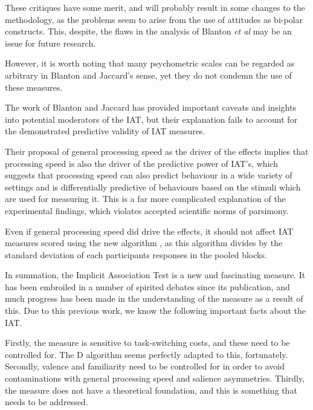 These critiques have some merit, and will probably result in some changes to the methodology, as the problems seem to arise from the use of attitudes as bi-polar constructs. This, despite, the flaws in the analysis of Blanton \textit{et al}  may be an issue for future research. %

However, it is worth noting that many psychometric scales can be regarded as arbitrary in Blanton and Jaccard's sense, yet they do not condemn the use of these measures. 

The work of Blanton and Jaccard has provided important caveats and insights into potential moderators of the IAT, but their explanation fails to account for the demonstrated predictive validity of IAT measures\cite{Richetin2007,Arcuri2008,Greenwald2000}.  

Their proposal of general processing speed as the driver of the effects implies that processing speed is also the driver of the predictive power of IAT's, which suggests that processing speed can also predict behaviour in a wide variety of settings and is differentially predictive of behaviours based on the stimuli which are used for measuring it. This is a far more complicated explanation of the experimental findings, which violates accepted scientific norms of parsimony. 

Even if general processing speed did drive the effects, it should not affect IAT measures scored using the new algorithm \cite{Greenwald2003a}, as this algorithm divides by the standard deviation of each participants responses in the pooled blocks.  


In summation, the Implicit Association Test is a new and fascinating measure. It has been embroiled in a number of spirited debates since its publication, and much progress has been made in the understanding of the measure as a result of this. Due to this previous work, we know the following important facts about the IAT. 

Firstly, the measure is sensitive to task-switching costs, and these need to be controlled for. The D algorithm seems perfectly adapted to this, fortunately. Secondly, valence and familiarity need to be controlled for in order to avoid contaminations with general processing speed and salience asymmetries. Thirdly, the measure does not have a theoretical foundation, and this is something that needs to be addressed. 

